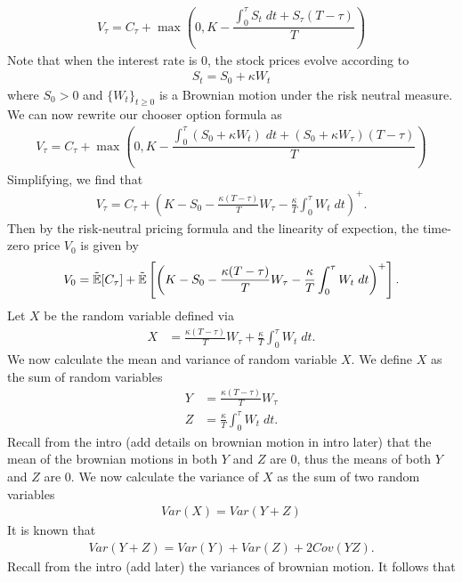 \documentclass[reqno]{amsart}
\begin{document}
\begin{align}
     V_\tau = C_\tau + \max(0, K - \dfrac{\int_0^\tau S_t \; dt + S_\tau (T - \tau)}{T})
\end{align}
Note that when the interest rate is $0$, the stock prices evolve according to 
\begin{align}
     S_t = S_0 + \kappa W_t
\end{align}
where $S_0 > 0$ and $\{W_t\}_{t \ge 0}$ is a Brownian motion under the risk neutral measure. We can now rewrite our chooser option formula as
\begin{align}
     V_\tau = C_\tau + \max(0, K - \dfrac{\int_0^\tau \left( S_0 + \kappa W_t \right) \; dt + (S_0 + \kappa W_\tau) (T - \tau)}{T})
\end{align}
Simplifying, we find that 
\begin{align}
     V_\tau = C_\tau + \left(K- S_0 - \frac{\kappa(T-\tau)}{T} W_\tau - \frac{\kappa}{T} \int_0^\tau W_t \; dt  \right)^+.
\end{align}
Then by the risk-neutral pricing formula and the linearity of expection, the time-zero price $V_0$ is given by
\begin{align} \label{eq: expect form}
     V_0 = \tilde{\mathbb{E}}[C_\tau] + \tilde{\mathbb{E}}\left[\left(K- S_0 - \frac{\kappa(T-\tau)}{T} W_\tau - \frac{\kappa}{T} \int_0^\tau W_t \; dt  \right)^+\right].
\end{align}
Let $X$ be the random variable defined via 
\begin{align}
     X &= \frac{\kappa(T-\tau)}{T} W_\tau + \frac{\kappa}{T} \int_0^\tau W_t \; dt.
\end{align}
We now calculate the mean and variance of random variable $X$. We define $X$ as the sum of random variables
\begin{align}
     Y &= \frac{\kappa(T-\tau)}{T} W_\tau\\
     Z &= \frac{\kappa}{T} \int_0^\tau W_t \; dt.
\end{align}
Recall from the intro (add details on brownian motion in intro later) that the mean of the brownian motions in both $Y$ and $Z$ are $0$, thus the means of both $Y$ and $Z$ are 0. 
We now calculate the variance of $X$ as the sum of two random variables
\begin{align}
     Var(X) = Var(Y + Z)
\end{align}
It is known that
\begin{align}
     Var(Y + Z) = Var(Y) + Var(Z) + 2Cov(YZ).
\end{align}
Recall from the intro (add later) the variances of brownian motion. It follows that 
\end{document}
